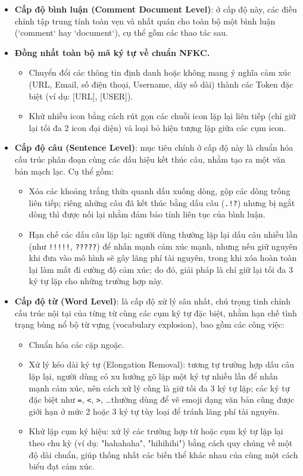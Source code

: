 \begin{itemize}[label=-]
    \item \textbf{Cấp độ bình luận (Comment Document Level)}: ở cấp độ này, các điều chỉnh tập trung tính toàn vẹn và nhất quán cho toàn bộ một bình luận (`comment` hay `document`), cụ thể gồm các thao tác sau.
    \item \textbf{Đồng nhất toàn bộ mã ký tự về chuẩn NFKC.}
        \begin{itemize}[label=-]
            \item Chuyển đổi các thông tin định danh hoặc không mang ý nghĩa cảm xúc (URL, Email, số điện thoại, Username, dãy số dài) thành các Token đặc biệt (ví dụ: [URL], [USER]).
            \item Khử nhiễu icon bằng cách rút gọn các chuỗi icon lặp lại liên tiếp (chỉ giữ lại tối đa 2 icon đại diện) và loại bỏ hiện tượng lặp giữa các cụm icon.
        \end{itemize}

    \item \textbf{Cấp độ câu (Sentence Level)}: mục tiêu chính ở cấp độ này là chuẩn hóa cấu trúc phân đoạn cùng các dấu hiệu kết thúc câu, nhằm tạo ra một văn bản mạch lạc. Cụ thể gồm:
        \begin{itemize}[label=-]
            \item Xóa các khoảng trắng thừa quanh dấu xuống dòng, gộp các dòng trống liên tiếp; riêng những câu đã kết thúc bằng dấu câu (\texttt{.!?}) nhưng bị ngắt dòng thì được nối lại nhằm đảm bảo tính liên tục của bình luận.
            \item Hạn chế các dấu câu lặp lại: người dùng thường lặp lại dấu câu nhiều lần (như \texttt{!!!!!}, \texttt{?????}) để nhấn mạnh cảm xúc mạnh, nhưng nếu giữ nguyên khi đưa vào mô hình sẽ gây lãng phí tài nguyên, trong khi xóa hoàn toàn lại làm mất đi cường độ cảm xúc; do đó, giải pháp là chỉ giữ lại tối đa 3 ký tự lặp cho những trường hợp này.
        \end{itemize}
    \item \textbf{Cấp độ từ (Word Level)}: là cấp độ xử lý sâu nhất, chú trọng tinh chỉnh cấu trúc nội tại của từng từ cùng các cụm ký tự đặc biệt, nhằm hạn chế tình trạng bùng nổ bộ từ vựng (vocabulary explosion), bao gồm các công việc:
        \begin{itemize}[label=-]
            \item Chuẩn hóa các cặp ngoặc.
            \item Xử lý kéo dài ký tự (Elongation Removal): tương tự trường hợp dấu câu lặp lại, người dùng có xu hướng gõ lặp một ký tự nhiều lần để nhấn mạnh cảm xúc, nên cách xử lý cũng là giữ tối đa 3 ký tự lặp; các ký tự đặc biệt như \texttt{=}, \texttt{<}, \texttt{>}, \dots thường dùng để vẽ emoji dạng văn bản cũng được giới hạn ở mức 2 hoặc 3 ký tự tùy loại để tránh lãng phí tài nguyên.
            \item Khử lặp cụm ký hiệu: xử lý các trường hợp từ hoặc cụm ký tự lặp lại theo chu kỳ (ví dụ: "hahahaha", "hihihihi") bằng cách quy chúng về một độ dài chuẩn, giúp thống nhất các biến thể khác nhau của cùng một cách biểu đạt cảm xúc.
        \end{itemize}
\end{itemize}


